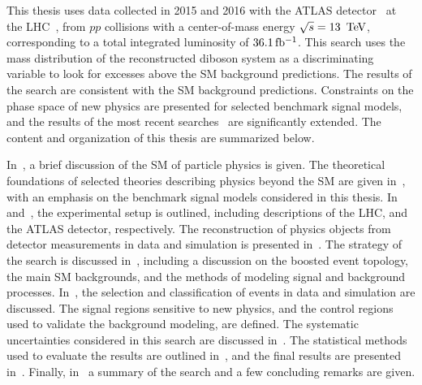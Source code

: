 This thesis uses data collected in 2015 and 2016 with the ATLAS detector~\cite{ATLAS} at the LHC~\cite{LHC}, from $pp$ collisions with a center-of-mass energy $\sqrt{s}=13\,\TeV$, corresponding to a total integrated luminosity of $36.1\,\mbox{fb$^{-1}$}$.  This search uses the mass distribution of the reconstructed diboson system as a discriminating variable to look for excesses above the SM background predictions. The results of the search are consistent with the SM background predictions. Constraints on the phase space of new physics are presented for selected benchmark signal models, and the results of the most recent searches~\cite{diboson_comb_2016, ATLAS_comb_run1, lvjj_run1, CMS_diboson_run2, CMS_diboson_run1run2, CMS_dijet_run1, CMS_diboson_run1} are significantly extended. The content and organization of this thesis are summarized below. 


In~\Ch{\ref{ch:stdmodel}}, a brief discussion of the SM of particle physics is given. The theoretical foundations of selected theories describing physics beyond the SM are given in~\Ch{\ref{ch:limitations}}, with an emphasis on the benchmark signal models considered in this thesis. In~\Ch{\ref{ch:lhc}} and~\Ch{\ref{ch:atlas}}, the experimental setup is outlined, including descriptions of the LHC, and the ATLAS detector, respectively. 
The reconstruction of physics objects from detector measurements in data and simulation is presented in~\Ch{\ref{ch:objreco}}. The strategy of the search is discussed in~\Ch{\ref{ch:analysisStrategy}}, including a discussion on the boosted event topology, the main SM backgrounds, and the methods of modeling signal and background processes. In~\Ch{\ref{ch:event_selection}}, the selection and classification of events in data and simulation are discussed. The signal regions sensitive to new physics, and the control regions used to validate the background modeling, are defined. 
The systematic uncertainties considered in this search are discussed in~\Ch{\ref{ch:syst}}. The statistical methods used to evaluate the results are outlined in~\Ch{\ref{ch:stats}}, and the final results are presented in~\Ch{\ref{ch:results}}. Finally, in~\Ch{\ref{sec:conclusions}} a summary of the search and a few concluding remarks are given.




